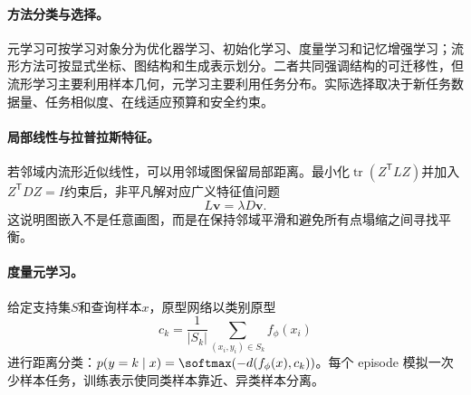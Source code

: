 \paragraph{方法分类与选择。}
元学习可按学习对象分为优化器学习、初始化学习、度量学习和记忆增强学习；流形方法可按显式坐标、图结构和生成表示划分。二者共同强调结构的可迁移性，但流形学习主要利用样本几何，元学习主要利用任务分布。实际选择取决于新任务数据量、任务相似度、在线适应预算和安全约束。

\begin{table}[htbp]
\centering
\caption{流形表示与元学习方法的选择依据}
\scriptsize
\setlength{\tabcolsep}{3pt}
\end{table}

\paragraph{局部线性与拉普拉斯特征。}
若邻域内流形近似线性，可以用邻域图保留局部距离。最小化$\operatorname{tr}(Z^{\mathsf T}LZ)$并加入$Z^{\mathsf T}DZ=I$约束后，非平凡解对应广义特征值问题
\begin{equation}
 L\bm{v}=\lambda D\bm{v}.
\end{equation}
这说明图嵌入不是任意画图，而是在保持邻域平滑和避免所有点塌缩之间寻找平衡。

\paragraph{度量元学习。}
给定支持集$S$和查询样本$x$，原型网络以类别原型
\begin{equation}
 c_k=\frac1{|S_k|}\sum_{(x_i,y_i)\in S_k}f_\phi(x_i)
\end{equation}
进行距离分类：$p(y=k\mid x)=\softmax(-d(f_\phi(x),c_k))$。每个 episode 模拟一次少样本任务，训练表示使同类样本靠近、异类样本分离。

